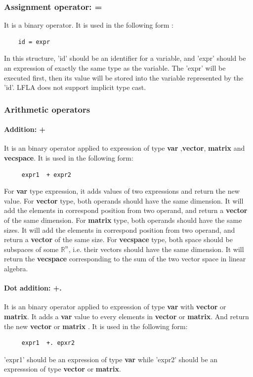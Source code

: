 \documentclass[12pt]{article} %
\begin{document}
\subsubsection{Assignment operator: =}
It is a binary operator. It is used in the following form :
\begin{lstlisting}
    id = expr 
\end{lstlisting}
In this structure, 'id'  should be an identifier for a variable, and 'expr' should be an expression of exactly the same type as the variable. The 'expr' will be executed first, then its value will be stored into the variable represented by the 'id'.  LFLA does not support implicit type cast.
\subsubsection{Arithmetic operators}
\paragraph{Addition: + }
It is an binary operator applied to expression of type \textbf{var} ,\textbf{vector}, \textbf{matrix} and \textbf{vecspace}.  It is used in the following form:
\begin{lstlisting}
     expr1  + expr2
\end{lstlisting}
For \textbf{var} type expression, it adds values of two expressions and return the new value. For \textbf{vector}  type,  both operands should have the same dimension.
  It will add the elements in correspond position from two  operand, and return a \textbf{vector} of the same dimension. For \textbf{matrix} type, both operands should have the same sizes. 
It will add the elements in correspond position from two  operand, and return a \textbf{vector} of the same  size. For \textbf{vecspace} type, both space should be subspaces of some $\mathbb{R}^n$, i.e. their vectors should have the same dimension. It will return the \textbf{vecspace} corresponding to the sum of the two vector space in linear algebra.
 
\paragraph{ Dot addition: +.  }
It is an binary operator applied to expression of type  \textbf{var} with \textbf{vector} or \textbf{matrix}. It adds a \textbf{var} value to every elements in \textbf{vector}  or  \textbf{matrix}. And return the new \textbf{vector} or  \textbf{matrix} . It is used in the following form: 
\begin{lstlisting}
     expr1  +. epxr2
\end{lstlisting}
'expr1' should be an expression of type  \textbf{var} while 'expr2' should be an expresssion of type  \textbf{vector} or  \textbf{matrix}.
\end{document}
